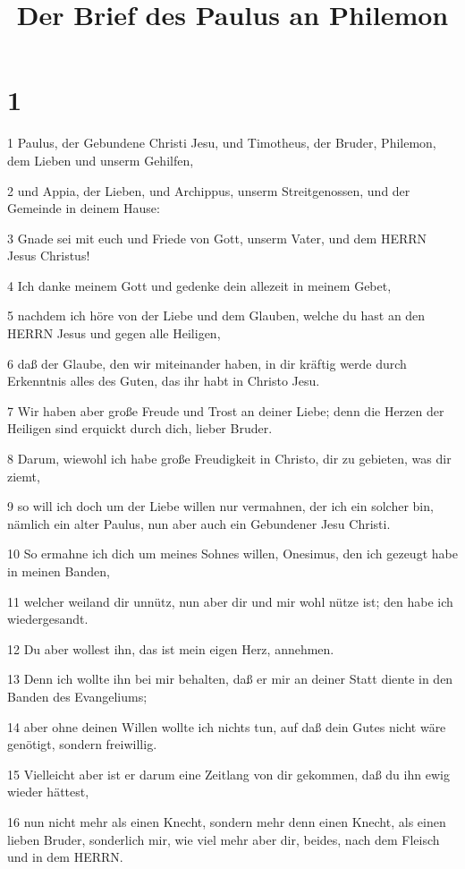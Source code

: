 

\title{Der Brief des Paulus an Philemon}


\chapter{1}

\par 1 Paulus, der Gebundene Christi Jesu, und Timotheus, der Bruder, Philemon, dem Lieben und unserm Gehilfen,
\par 2 und Appia, der Lieben, und Archippus, unserm Streitgenossen, und der Gemeinde in deinem Hause:
\par 3 Gnade sei mit euch und Friede von Gott, unserm Vater, und dem HERRN Jesus Christus!
\par 4 Ich danke meinem Gott und gedenke dein allezeit in meinem Gebet,
\par 5 nachdem ich höre von der Liebe und dem Glauben, welche du hast an den HERRN Jesus und gegen alle Heiligen,
\par 6 daß der Glaube, den wir miteinander haben, in dir kräftig werde durch Erkenntnis alles des Guten, das ihr habt in Christo Jesu.
\par 7 Wir haben aber große Freude und Trost an deiner Liebe; denn die Herzen der Heiligen sind erquickt durch dich, lieber Bruder.
\par 8 Darum, wiewohl ich habe große Freudigkeit in Christo, dir zu gebieten, was dir ziemt,
\par 9 so will ich doch um der Liebe willen nur vermahnen, der ich ein solcher bin, nämlich ein alter Paulus, nun aber auch ein Gebundener Jesu Christi.
\par 10 So ermahne ich dich um meines Sohnes willen, Onesimus, den ich gezeugt habe in meinen Banden,
\par 11 welcher weiland dir unnütz, nun aber dir und mir wohl nütze ist; den habe ich wiedergesandt.
\par 12 Du aber wollest ihn, das ist mein eigen Herz, annehmen.
\par 13 Denn ich wollte ihn bei mir behalten, daß er mir an deiner Statt diente in den Banden des Evangeliums;
\par 14 aber ohne deinen Willen wollte ich nichts tun, auf daß dein Gutes nicht wäre genötigt, sondern freiwillig.
\par 15 Vielleicht aber ist er darum eine Zeitlang von dir gekommen, daß du ihn ewig wieder hättest,
\par 16 nun nicht mehr als einen Knecht, sondern mehr denn einen Knecht, als einen lieben Bruder, sonderlich mir, wie viel mehr aber dir, beides, nach dem Fleisch und in dem HERRN.
